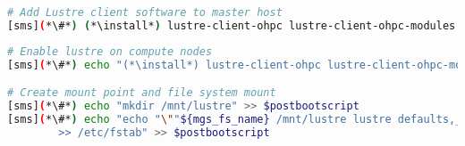 
\begin{lstlisting}[language=bash,keywords={},upquote=true]
# Add Lustre client software to master host
[sms](*\#*) (*\install*) lustre-client-ohpc lustre-client-ohpc-modules
\end{lstlisting}

\begin{lstlisting}[language=bash,keywords={},upquote=true]
# Enable lustre on compute nodes
[sms](*\#*) echo "(*\install*) lustre-client-ohpc lustre-client-ohpc-modules" >> $postbootscript

# Create mount point and file system mount
[sms](*\#*) echo "mkdir /mnt/lustre" >> $postbootscript
[sms](*\#*) echo "echo "\""${mgs_fs_name} /mnt/lustre lustre defaults,_netdev,localflock 0 0"\"" \
        >> /etc/fstab" >> $postbootscript
\end{lstlisting}

